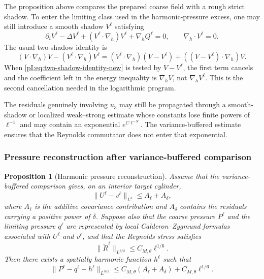 \documentclass[11pt]{article}
\numberwithin{equation}{section}
\theoremstyle{plain}
\newtheorem{proposition}{Proposition}[section]
\theoremstyle{definition}
\theoremstyle{remark}
\newcommand{\nabh}{\nabla_h}
\newcommand{\divh}{\nabla_h\!\cdot}
\begin{document}
The proposition above compares the prepared coarse field with a rough strict shadow.  To enter the limiting class used in the harmonic-pressure excess, one may still introduce a smooth shadow \(V^\ell\) satisfying
\begin{equation}\label{pI:eq:smooth-shadow-variance}
        \partial_tV^\ell-
        \Delta V^\ell+(V^\ell\cdot\nabh)V^\ell+
        \nabh Q^\ell=0,
        \qquad
        \divh V^\ell=0.
\end{equation}
The usual two-shadow identity is
\begin{equation}\label{pI:eq:two-shadow-identity-new}
        (V\cdot\nabh)V-(V^\ell\cdot\nabh)V^\ell
        =(V^\ell\cdot\nabh)(V-V^\ell)+((V-V^\ell)\cdot\nabh)V.
\end{equation}
When \eqref{pI:eq:two-shadow-identity-new} is tested by \(V-V^\ell\), the first term cancels and the coefficient left in the energy inequality is \(\nabh V\), not \(\nabh V^\ell\).  This is the second cancellation needed in the logarithmic program.

The residuals genuinely involving \(u_3\) may still be propagated through a smooth-shadow or localized weak--strong estimate whose constants lose finite powers of \(\ell^{-1}\) and may contain an exponential \(e^{C\ell^{-N}}\).  The variance-buffered estimate ensures that the Reynolds commutator does not enter that exponential.

\subsubsection{Pressure reconstruction after variance-buffered comparison}

\begin{proposition}[Harmonic pressure reconstruction]\label{pI:prop:shadow-pressure-reconstruction}
Assume that the variance-buffered comparison gives, on an interior target cylinder,
\[
        \|U^\ell-v^\ell\|_{L^3}\le A_\ell+A_\delta,
\]
where \(A_\ell\) is the additive covariance contribution and \(A_\delta\) contains the residuals carrying a positive power of \(\delta\).  Suppose also that the coarse pressure \(P^\ell\) and the limiting pressure \(q^\ell\) are represented by local Calderon--Zygmund formulas associated with \(U^\ell\) and \(v^\ell\), and that the Reynolds stress satisfies
\[
        \|\widetilde R^\ell\|_{L^{3/2}}\le C_{M,\theta}\ell^{1/6}.
\]
Then there exists a spatially harmonic function \(h^\ell\) such that
\begin{equation}\label{pI:eq:pressure-after-variance}
        \|P^\ell-q^\ell-h^\ell\|_{L^{3/2}}
        \le C_{M,\theta}(A_\ell+A_\delta)+C_{M,\theta}\ell^{1/6}.
\end{equation}
\end{proposition}
\end{document}
